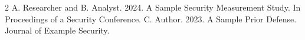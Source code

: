\documentclass[sigconf,anonymous,review]{acmart}
\begin{document}


\maketitle










\begin{thebibliography}{2}
 A. Researcher and B. Analyst. 2024. A Sample Security Measurement Study. In Proceedings of a Security Conference.
 C. Author. 2023. A Sample Prior Defense. Journal of Example Security.
\end{thebibliography}
\end{document}
